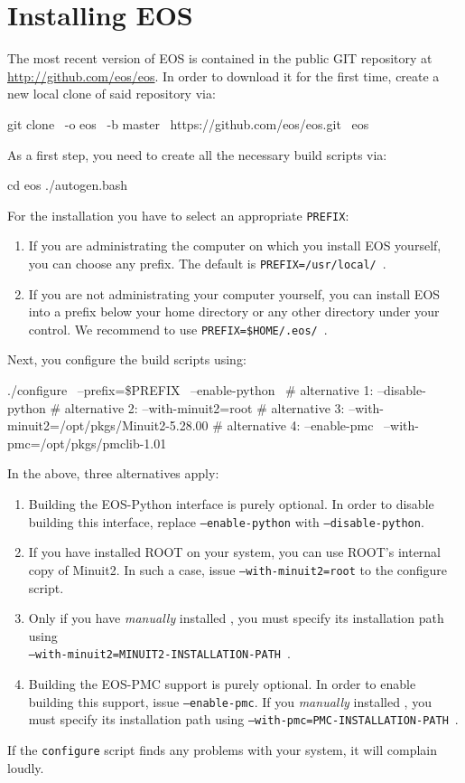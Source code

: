 \section{Installing EOS}

The most recent version of EOS is contained in the public GIT \cite{GIT}
repository at \url{http://github.com/eos/eos}.  In order to download it for the
first time, create a new local clone of said repository via:
%
\begin{commandline}
git clone \
    -o eos \
    -b master \
    https://github.com/eos/eos.git \
    eos
\end{commandline}


As a first step, you need to create all the necessary build scripts via:
%
\begin{commandline}
cd eos
./autogen.bash
\end{commandline}
%
For the installation you have to select an appropriate \texttt{PREFIX}:
\begin{enumerate}
    \item If you are administrating the computer on which you install EOS yourself,
    you can choose any prefix. The default is \texttt{PREFIX=/usr/local/}~.
    \item If you are not administrating your computer yourself, you can install
    EOS into a prefix below your home directory or any other directory under your
    control. We recommend to use \texttt{PREFIX=\$HOME/.eos/}~.
\end{enumerate}
Next, you configure the build scripts using:
%
\begin{commandline}
./configure \
    --prefix=\$PREFIX \
    --enable-python \
    # alternative 1: --disable-python
    # alternative 2: --with-minuit2=root
    # alternative 3: --with-minuit2=/opt/pkgs/Minuit2-5.28.00
    # alternative 4: --enable-pmc \
                     --with-pmc=/opt/pkgs/pmclib-1.01
\end{commandline}
%
In the above, three alternatives apply:
\begin{enumerate}
    \item Building the EOS-Python interface is purely optional. In order to disable building
    this interface, replace \texttt{--enable-python} with \texttt{--disable-python}.
    \item If you have installed ROOT on your system, you can use ROOT's internal copy of Minuit2.
    In such a case, issue \texttt{--with-minuit2=root} to the configure script.
    \item Only if you have \emph{manually} installed , you must specify its installation
    path using\\ \texttt{--with-minuit2=MINUIT2-INSTALLATION-PATH}~.
    \item Building the EOS-PMC support is purely optional. In order to enable building this
    support, issue \texttt{--enable-pmc}. If you \emph{manually} installed , you
    must specify its installation path using \texttt{--with-pmc=PMC-INSTALLATION-PATH}~.
\end{enumerate}
If the \texttt{configure} script finds any problems with your system, it will complain loudly.\\

